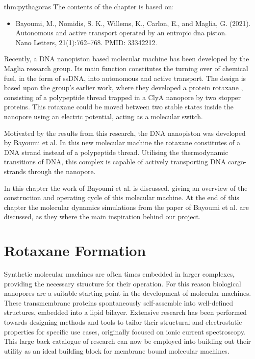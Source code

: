 
\begin{theo}{thm:pythagoras}
  The contents of the chapter is based on:
  \vspace{-0.4cm}
  \begin{itemize}
    \item Bayoumi, M., Nomidis, S. K., Willems, K., Carlon, E., and Maglia, G. (2021).
      Autonomous and active transport operated by an entropic dna piston.\\
      Nano Letters, 21(1):762–768. PMID: 33342212.
  \end{itemize}
  \vspace{0.3cm}
\end{theo}

Recently, a DNA nanopiston based molecular machine has been developed by the Maglia
research group. Its main function constitutes the turning over of chemical fuel, in the
form of ssDNA, into autonomous and active transport. The design is based upon the group's
earlier work, where they developed a protein rotaxane \cite{Biesemans2015}, consisting of
a polypeptide thread trapped in
a ClyA nanopore by two stopper proteins. This rotaxane could be moved between two stable
states inside the nanopore using an electric potential, acting as a molecular switch.

Motivated by the results from this research, the DNA nanopiston was developed by Bayoumi
et al. In this new molecular machine the rotaxane constitutes of
a DNA strand instead of a polypeptide thread. Utilising the thermodynamic transitions of
DNA, this complex is capable of actively transporting DNA cargo-strands through the
nanopore.

In this chapter the work of Bayoumi et al. is discussed, giving an overview of the
construction and operating cycle of this molecular machine.  At the end of this chapter
the molecular dynamics simulations from the paper of Bayoumi et al. are discussed, as
they where the main inspiration behind our project.

\section{Rotaxane Formation}

Synthetic molecular machines are often times embedded in larger complexes, providing the
necessary structure for their operation. For this reason biological nanopores are a
suitable starting point in the development of molecular machines. These transmembrane
proteins spontaneously self-assemble into well-defined structures, embedded into a lipid
bilayer. Extensive research has been performed towards designing methods and tools to
tailor their structural and electrostatic properties for specific use cases, originally
focused on ionic current spectroscopy. This large back catalogue of research can now be
employed into building out their utility as an ideal building block for membrane bound
molecular machines.

